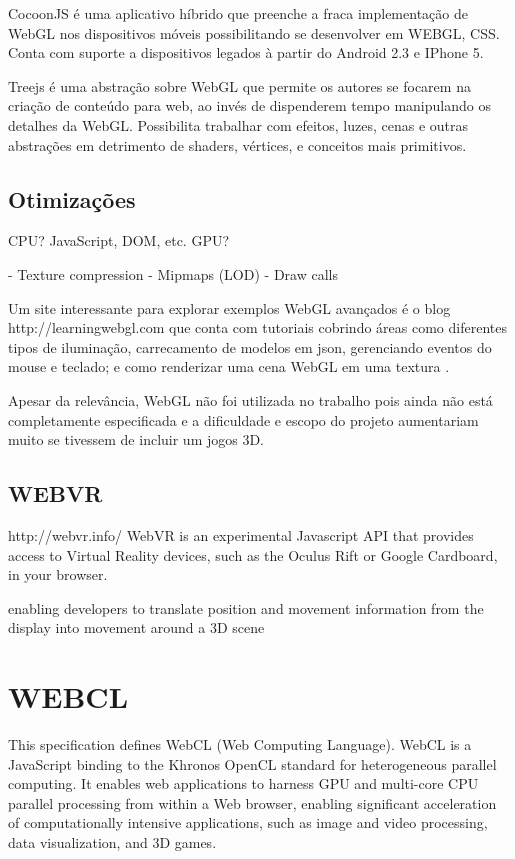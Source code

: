 CocoonJS é uma aplicativo híbrido que preenche a fraca implementação
de WebGL nos dispositivos móveis possibilitando se desenvolver em
WEBGL, CSS. Conta com suporte a dispositivos legados à partir do
Android 2.3 e IPhone 5.

Treejs é uma abstração sobre WebGL que permite os autores se focarem
na criação de conteúdo para web, ao invés de dispenderem tempo manipulando
os detalhes da WebGL. Possibilita trabalhar com efeitos, luzes, cenas
e outras abstrações em detrimento de shaders, vértices, e conceitos mais
primitivos.

\subsection{Otimizações}
CPU? JavaScript, DOM, etc.
GPU?

- Texture compression
- Mipmaps (LOD)
- Draw calls

Um site interessante para explorar exemplos WebGL avançados é o blog
http://learningwebgl.com que conta com tutoriais cobrindo áreas como
diferentes tipos de iluminação, carrecamento de modelos em json,
gerenciando eventos do mouse e teclado; e como renderizar uma cena WebGL
em uma textura \autocite[pp.42]{3daps}.

Apesar da relevância, WebGL não foi utilizada no trabalho pois ainda
não está completamente especificada e a dificuldade e escopo do
projeto aumentariam muito se tivessem de incluir um jogos 3D.

\subsection{WEBVR}
http://webvr.info/
WebVR is an experimental Javascript API that provides access to Virtual Reality devices, such as the Oculus Rift or Google Cardboard, in your browser.

enabling developers to translate position and movement information from the display into movement around a 3D scene
\section{WEBCL}
This specification defines WebCL (Web Computing Language). WebCL is a JavaScript binding to the Khronos OpenCL standard for heterogeneous parallel computing. It enables web applications to harness GPU and multi-core CPU parallel processing from within a Web browser, enabling significant acceleration of computationally intensive applications, such as image and video processing, data visualization, and 3D games.

